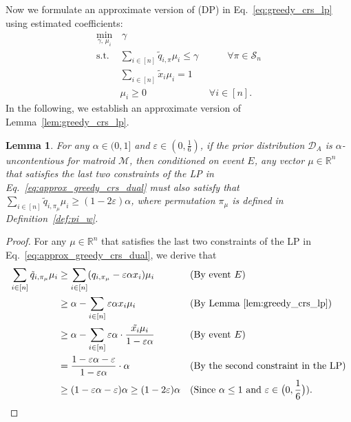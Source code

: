 \documentclass[11pt]{article}
\newcommand{\D}{\mathcal D}
\newcommand{\M}{{\mathcal M}}
\newcommand{\cS}{{\mathcal S}}
\newcommand{\eps}{\varepsilon}
\newcommand{\R}{{\mathbb R}}
\newtheorem{lemma}[theorem]{Lemma}
\begin{document}
Now we formulate an approximate version of (DP) in Eq.~\eqref{eq:greedy_crs_lp} using estimated coefficients:
\begin{align}\label{eq:approx_greedy_crs_dual}
    \min_{\gamma,\,\mu_i}&\,\gamma\nonumber\\
    \textrm{s.t. }& \sum_{i\in[n]} \tilde{q}_{i,\pi}\mu_i\le\gamma \qquad\,\,\,\,\,\,\forall\pi\in\cS_n\nonumber\\
    & \sum_{i\in[n]}\tilde{x}_i\mu_i=1\nonumber\\
    & \mu_i\ge 0 \qquad\qquad\qquad\,\,\,\forall i\in [n].
\end{align}
In the following, we establish an approximate version of Lemma~\ref{lem:greedy_crs_lp}.
\begin{lemma}\label{lem:approx_greedy_crs_dual}
For any $\alpha\in(0,1]$ and $\eps\in\left(0,\frac{1}{6}\right)$, if the prior distribution $\D_A$ is $\alpha$-uncontentious for matroid $\M$, then conditioned on event $E$, any vector $\mu\in\R^n$ that satisfies the last two constraints of the LP in Eq.~\eqref{eq:approx_greedy_crs_dual} must also satisfy that $\sum_{i\in[n]} \tilde{q}_{i,\pi_{\mu}}\mu_i\ge(1-2\eps)\alpha$, where permutation $\pi_{\mu}$ is defined in Definition~\ref{def:pi_w}.
\end{lemma}
\begin{proof}
For any $\mu\in\R^n$ that satisfies the last two constraints of the LP in Eq.~\eqref{eq:approx_greedy_crs_dual}, we derive that
\begin{align*}
\sum_{i\in[n]}\tilde{q}_{i,\pi_{\mu}}\mu_i&\ge\sum_{i\in[n]}(q_{i,\pi_{\mu}}-\eps\alpha x_i)\mu_i &&\text{(By event $E$)}\\
&\ge\alpha-\sum_{i\in[n]}\eps\alpha x_i\mu_i &&\text{(By Lemma~\ref{lem:greedy_crs_lp})}\\
&\ge\alpha-\sum_{i\in[n]}\eps\alpha\cdot\frac{\tilde{x_i}\mu_i}{1-\eps\alpha} &&\text{(By event $E$)}\\
&=\frac{1-\eps\alpha-\eps}{1-\eps\alpha}\cdot\alpha &&\text{(By the second constraint in the LP)}\\
&\ge(1-\eps\alpha-\eps)\alpha\ge(1-2\eps)\alpha &&\text{(Since $\alpha\le1$ and $\eps\in\big(0,\frac{1}{6}\big)$)}.
\end{align*}
\end{proof}
\end{document}
